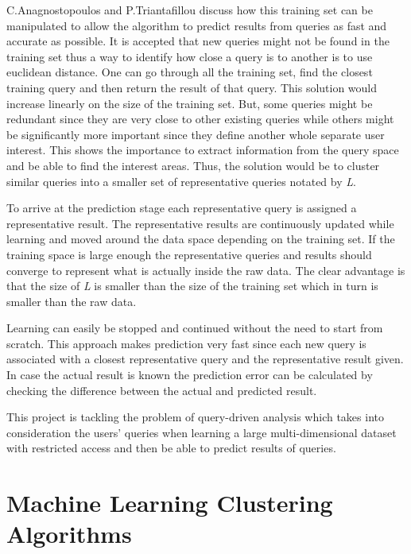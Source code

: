 \documentclass{lmproj}
\begin{document}
C.Anagnostopoulos and P.Triantafillou\cite{learningCount} discuss how this training set can be manipulated to allow the algorithm to predict results from queries as fast and accurate as possible. It is accepted that new queries might not be found in the training set thus a way to identify how close a query is to another is to use euclidean distance. One can go through all the training set, find the closest training query and then return the result of that query. This solution would increase linearly on the size of the training set. But, some queries might be redundant since they are very close to other existing queries while others might be significantly more important since they define another whole separate user interest. This shows the importance to extract information from the query space and be able to find the interest areas. Thus, the solution would be to cluster similar queries into a smaller set of representative queries notated by \textit{L}.

To arrive at the prediction stage each representative query is assigned a representative result. The representative results are continuously updated while learning and moved around the data space depending on the training set. If the training space is large enough the representative queries and results should converge to represent what is actually inside the raw data. The clear advantage is that the size of \textit{L} is smaller than the size of the training set which in turn is smaller than the raw data.\cite{learningCount}

Learning can easily be stopped and continued without the need to start from scratch. This approach makes prediction very fast since each new query is associated with a closest representative query and the representative result given. In case the actual result is known the prediction error can be calculated by checking the difference between the actual and predicted result.\cite{learningCount}

This project is tackling the problem of query-driven analysis which takes into consideration the users' queries when learning a large multi-dimensional dataset with restricted access and then be able to predict results of queries.

\chapter{Machine Learning Clustering Algorithms}
\label{clustering}
\end{document}
